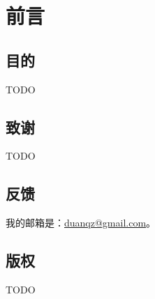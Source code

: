 \chapter{前言}
\section*{目的}
TODO
\section*{致谢}
TODO

\section*{反馈}
我的邮箱是：\href{mailto:duanqz@gmail.com}{duanqz@gmail.com}。

\section*{版权}
TODO

